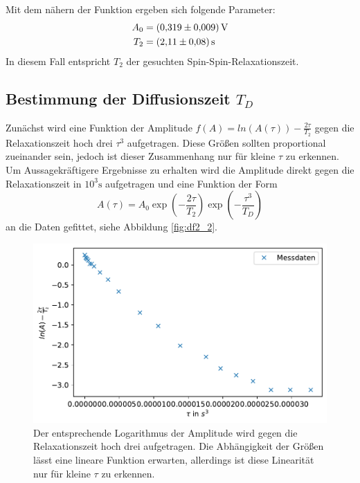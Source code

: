 Mit dem nähern der Funktion ergeben sich folgende Parameter:
\begin{align*}
    A_0 &= \SI{0.319 +- 0.009}{\volt}\\
    T_2 &= \SI{2.11 +- 0.08}{\second}
\end{align*}
In diesem Fall entspricht $T_2$ der gesuchten Spin-Spin-Relaxationszeit.
\newpage
\subsection{Bestimmung der Diffusionszeit $T_D$}
Zunächst wird eine Funktion der Amplitude $f(A) = ln(A(\tau)) - \frac{2\tau}{T_2}$ gegen die Relaxationszeit hoch drei $\tau^3$ aufgetragen. 
Diese Größen sollten proportional zueinander sein, jedoch ist dieser Zusammenhang nur für kleine $\tau$ zu erkennen.
Um Aussagekräftigere Ergebnisse zu erhalten wird die Amplitude direkt gegen die Relaxationszeit in $10^3 \si{\second}$ aufgetragen und eine Funktion der Form
\begin{equation*}
    A\left(\tau\right) = A_0 \exp\left(- \frac{2\tau}{T_2}\right) \exp\left(-\frac{\tau^3}{T_D}\right)
\end{equation*}
an die Daten gefittet, siehe Abbildung \ref{fig:df2_2}.
\begin{figure}[ht]
    \center
    \includegraphics[scale = 0.75]{plots/df2.pdf}
    \caption{Der entsprechende Logarithmus der Amplitude wird gegen die Relaxationszeit hoch drei aufgetragen. Die Abhängigkeit der Größen lässt eine lineare Funktion erwarten, allerdings ist diese Linearität nur für kleine $\tau$ zu erkennen.}
    \label{fig:df2}
\end{figure}
